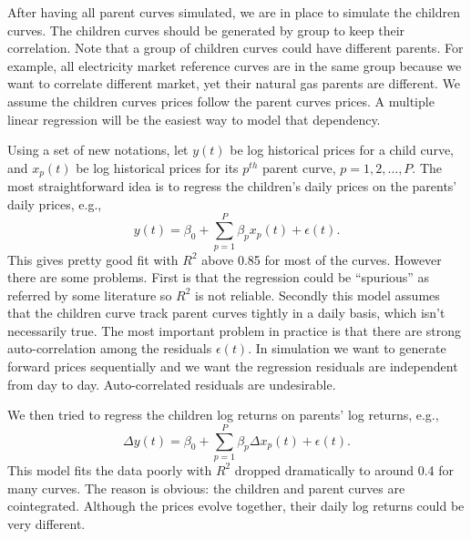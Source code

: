 \documentclass[12pt]{article}
\begin{document}
After having all parent curves simulated, we are in place
to simulate the children curves. The children curves
should be generated by group to keep their correlation.
Note that a group of children curves could have different
parents. For example, all electricity market reference
curves are in the same group because we want to correlate
different market, yet their natural gas parents are different. 
We assume the children curves prices follow the parent curves prices.
A multiple linear regression will be the easiest way
to model that dependency. 

Using a set of new notations, let $y(t)$ be log historical prices
for a child curve, and $x_p(t)$ be log historical prices
for its $p^{th}$ parent curve, $p=1, 2, \ldots, P$. 
The most straightforward idea is to regress the 
children's daily prices on the parents' daily prices, e.g.,
\begin{equation}
y(t)=\beta_0 + \sum_{p=1}^P \beta_p x_p(t) + \epsilon(t). 
\label{model1}
\end{equation}
This gives pretty good fit with $R^2$ above 0.85 for 
most of the curves. However there are some problems.
First is that the regression could be ``spurious'' as
referred by some literature so $R^2$ is not reliable. 
Secondly this model assumes that  the children curve 
track parent curves tightly in a daily basis, which 
isn't necessarily  true. 
The most important problem in practice  is that 
there are strong auto-correlation among the residuals 
$\epsilon(t)$. In simulation we want to generate forward
prices sequentially and we want the regression residuals 
are independent from day to day. Auto-correlated
residuals are undesirable.

We then tried to regress the children log returns
on parents' log returns, e.g.,
\begin{equation}
\Delta y(t)=\beta_0 + \sum_{p=1}^P \beta_p \Delta x_p(t) + \epsilon(t). 
\label{model2}
\end{equation}
This model fits the data poorly with $R^2$ dropped dramatically
to around 0.4 for many curves. The reason is obvious:
the children and parent curves are cointegrated.
Although the prices evolve together, their daily log returns 
could be very different. 
\end{document}
